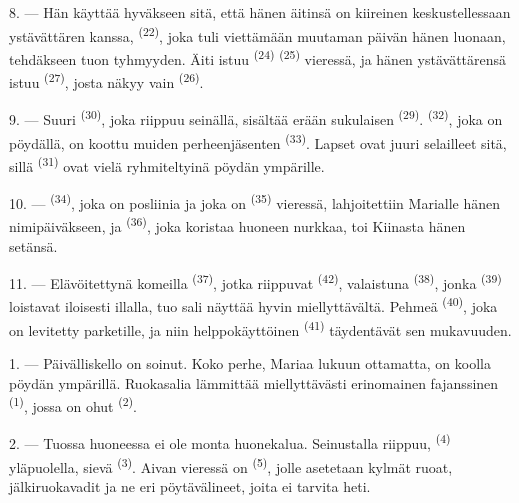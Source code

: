 8. --- Hän käyttää hyväkseen sitä, että hänen äitinsä on kiireinen
keskustellessaan ystävättären kanssa,  \textsuperscript{(22)},
joka tuli viettämään muutaman päivän hänen luonaan, tehdäkseen tuon
tyhmyyden. Äiti istuu  \textsuperscript{(24)}
 \textsuperscript{(25)} vieressä, ja hänen ystävättärensä
istuu  \textsuperscript{(27)}, josta näkyy vain
 \textsuperscript{(26)}.

9. --- Suuri  \textsuperscript{(30)}, joka riippuu seinällä,
sisältää erään sukulaisen  \textsuperscript{(29)}.
 \textsuperscript{(32)}, joka on pöydällä, on koottu muiden
perheenjäsenten  \textsuperscript{(33)}. Lapset ovat juuri
selailleet sitä, sillä  \textsuperscript{(31)} ovat vielä
ryhmiteltyinä pöydän ympärille.

10. ---  \textsuperscript{(34)}, joka on posliinia
ja joka on  \textsuperscript{(35)} vieressä, lahjoitettiin
Marialle hänen nimipäiväkseen, ja  \textsuperscript{(36)},
joka koristaa huoneen nurkkaa, toi Kiinasta hänen setänsä.

11. --- Elävöitettynä komeilla  \textsuperscript{(37)},
jotka riippuvat  \textsuperscript{(42)}, valaistuna
 \textsuperscript{(38)}, jonka 
\textsuperscript{(39)} loistavat iloisesti illalla, tuo sali näyttää hyvin
miellyttävältä. Pehmeä  \textsuperscript{(40)}, joka on levitetty
parketille, ja niin helppokäyttöinen 
\textsuperscript{(41)} täydentävät sen mukavuuden.

\VUsaut{3.6mm}
\VUsaut{3.0mm}

1. --- Päivälliskello on soinut. Koko perhe, Mariaa lukuun ottamatta, on koolla
pöydän ympärillä. Ruokasalia lämmittää miellyttävästi erinomainen fajanssinen
 \textsuperscript{(1)}, jossa on ohut 
\textsuperscript{(2)}.

2. --- Tuossa huoneessa ei ole monta huonekalua. Seinustalla riippuu,
 \textsuperscript{(4)} yläpuolella, sievä 
\textsuperscript{(3)}. Aivan vieressä on 
\textsuperscript{(5)}, jolle asetetaan kylmät ruoat, jälkiruokavadit ja ne eri
pöytävälineet, joita ei tarvita heti.

